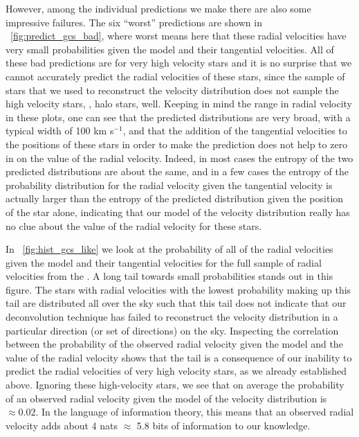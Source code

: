 However, among the individual predictions we make there are also some
impressive failures. The six ``worst'' predictions are shown in
\figurename~\ref{fig:predict_gcs_bad}, where worst means here that
these radial velocities have very small probabilities given the model
and their tangential velocities. All of these bad predictions are for
very high velocity stars and it is no surprise that we cannot
accurately predict the radial velocities of these stars, since the
sample of stars that we used to reconstruct the velocity distribution
does not sample the high velocity stars, \eg, halo stars,
well. Keeping in mind the range in radial velocity in these plots, one
can see that the predicted distributions are very broad, with a
typical width of 100 km s$^{-1}$, and that the addition of the
tangential velocities to the positions of these stars in order to make
the prediction does not help to zero in on the value of the radial
velocity. Indeed, in most cases the entropy of the two predicted
distributions are about the same, and in a few cases the entropy of
the probability distribution for the radial velocity given the
tangential velocity is actually larger than the entropy of the
predicted distribution given the position of the star alone,
indicating that our model of the velocity distribution really has no
clue about the value of the radial velocity for these stars.

In \figurename~\ref{fig:hist_gcs_like} we look at the probability of
all of the radial velocities given the model and their tangential
velocities for the full sample of radial velocities from the
\gcsabb. A long tail towards small probabilities stands out in this
figure. The stars with radial velocities with the lowest probability
making up this tail are distributed all over the sky such that this
tail does not indicate that our deconvolution technique has failed to
reconstruct the velocity distribution in a particular direction (or
set of directions) on the sky. Inspecting the correlation between the
probability of the observed radial velocity given the model and the
value of the radial velocity shows that the tail is a consequence of
our inability to predict the radial velocities of very high velocity
stars, as we already established above. Ignoring these high-velocity
stars, we see that on average the probability of an observed radial
velocity given the model of the velocity distribution is $\approx
0.02$. In the language of information theory, this means that an
observed radial velocity adds about 4 nats $\approx$ 5.8 bits of
information to our knowledge.

